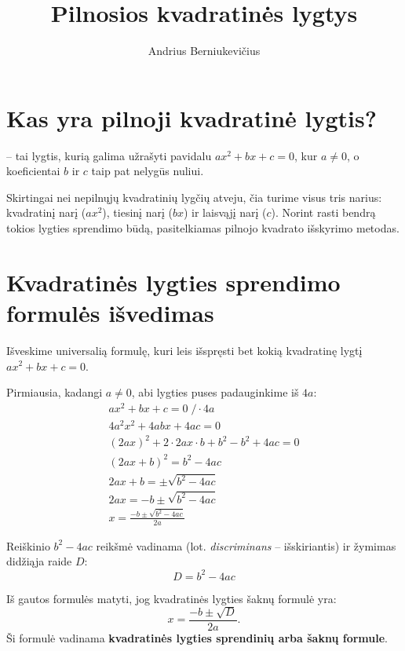 \documentclass[11pt,a4paper]{scrartcl}
\title{Pilnosios kvadratinės lygtys}
\author{Andrius Berniukevičius}
\begin{document}
\maketitle

\section{Kas yra pilnoji kvadratinė lygtis?}

\begin{definition}
 -- tai lygtis, kurią galima užrašyti pavidalu $ax^2+bx+c=0$, kur $a \neq 0$, o koeficientai $b$ ir $c$ taip pat nelygūs nuliui.
\end{definition}

Skirtingai nei nepilnųjų kvadratinių lygčių atveju, čia turime visus tris narius: kvadratinį narį ($ax^2$), tiesinį narį ($bx$) ir laisvąjį narį ($c$). Norint rasti bendrą tokios lygties sprendimo būdą, pasitelkiamas pilnojo kvadrato išskyrimo metodas.

\section{Kvadratinės lygties sprendimo formulės išvedimas}

Išveskime universalią formulę, kuri leis išspręsti bet kokią kvadratinę lygtį $ax^2+bx+c=0$. 

Pirmiausia, kadangi $a \neq 0$, abi lygties puses padauginkime iš $4a$:
\begin{equation}
\begin{gathered}
ax^2+bx+c=0 \;/\cdot 4a \\
4a^2x^2+4abx+4ac=0 \\
(2ax)^2+2\cdot 2ax\cdot b+b^2-b^2+4ac=0 \\
(2ax+b)^2=b^2-4ac \\
2ax+b=\pm\sqrt{b^2-4ac} \\
2ax=-b\pm\sqrt{b^2-4ac} \\
 x = \frac{-b\pm\sqrt{b^2-4ac}}{2a}
\end{gathered}
\end{equation}

\begin{definition}
Reiškinio  $b ^{2} -4ac $ reikšmė vadinama  (lot. \textit{discriminans} -- išskiriantis) ir žymimas didžiąja raide $D$:
\[ D = b^2 - 4ac \]
\end{definition}

Iš gautos formulės matyti, jog kvadratinės lygties šaknų formulė yra:
\[ x = \frac{-b \pm \sqrt{D}}{2a}. \]
Ši formulė vadinama \textbf{kvadratinės lygties sprendinių arba šaknų formule}.
\end{document}
